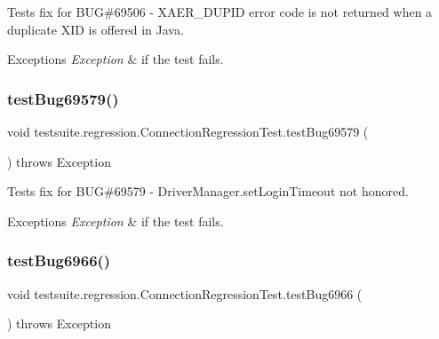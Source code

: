 Tests fix for B\+UG\#69506 -\/ X\+A\+E\+R\+\_\+\+D\+U\+P\+ID error code is not returned when a duplicate X\+ID is offered in Java.


\begin{DoxyExceptions}{Exceptions}
{\em Exception} & if the test fails. \\
\hline
\end{DoxyExceptions}
\mbox{\label{classtestsuite_1_1regression_1_1_connection_regression_test_a09e5aef6835aa4e8cf07bde4c3d06a28}} 
\subsubsection{\texorpdfstring{test\+Bug69579()}{testBug69579()}}
{\footnotesize\ttfamily void testsuite.\+regression.\+Connection\+Regression\+Test.\+test\+Bug69579 (\begin{DoxyParamCaption}{ }\end{DoxyParamCaption}) throws Exception}

Tests fix for B\+UG\#69579 -\/ Driver\+Manager.\+set\+Login\+Timeout not honored.


\begin{DoxyExceptions}{Exceptions}
{\em Exception} & if the test fails. \\
\hline
\end{DoxyExceptions}
\mbox{\label{classtestsuite_1_1regression_1_1_connection_regression_test_ad40619b88e8c45d0c604f376a8d0fd91}} 
\subsubsection{\texorpdfstring{test\+Bug6966()}{testBug6966()}}
{\footnotesize\ttfamily void testsuite.\+regression.\+Connection\+Regression\+Test.\+test\+Bug6966 (\begin{DoxyParamCaption}{ }\end{DoxyParamCaption}) throws Exception}

